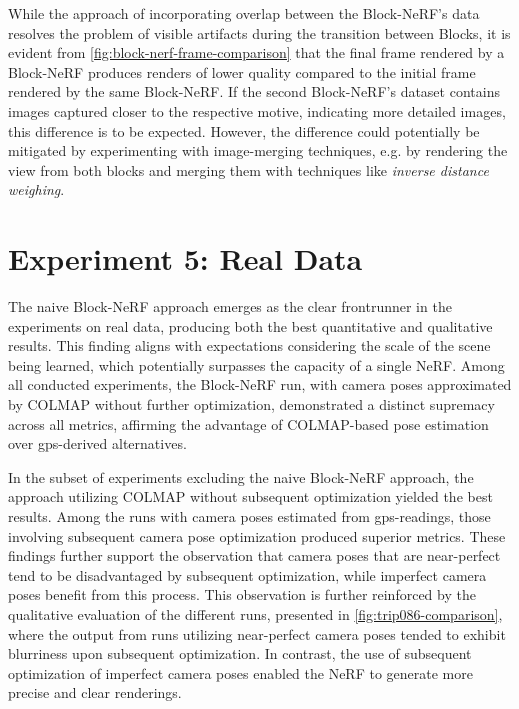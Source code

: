 While the approach of incorporating overlap between the Block-NeRF's data resolves the problem of visible artifacts during the transition between Blocks, it is evident from \autoref{fig:block-nerf-frame-comparison} that the final frame rendered by a Block-NeRF produces renders of lower quality compared to the initial frame rendered by the same Block-NeRF. If the second Block-NeRF's dataset contains images captured closer to the respective motive, indicating more detailed images, this difference is to be expected. However, the difference could potentially be mitigated by experimenting with image-merging techniques, e.g. by rendering the view from both blocks and merging them with techniques like \textit{inverse distance weighing}.




\section{Experiment 5: Real Data}
The naive Block-NeRF approach emerges as the clear frontrunner in the experiments on real data, producing both the best quantitative and qualitative results. This finding aligns with expectations considering the scale of the scene being learned, which potentially surpasses the capacity of a single NeRF. Among all conducted experiments, the Block-NeRF run, with camera poses approximated by COLMAP without further optimization, demonstrated a distinct supremacy across all metrics, affirming the advantage of COLMAP-based pose estimation over \acrshort{gps}-derived alternatives.

In the subset of experiments excluding the naive Block-NeRF approach, the approach utilizing COLMAP without subsequent optimization yielded the best results. Among the runs with camera poses estimated from \acrshort{gps}-readings, those involving subsequent camera pose optimization produced superior metrics. These findings further support the observation that camera poses that are near-perfect tend to be disadvantaged by subsequent optimization, while imperfect camera poses benefit from this process. This observation is further reinforced by the qualitative evaluation of the different runs, presented in \autoref{fig:trip086-comparison}, where the output from runs utilizing near-perfect camera poses tended to exhibit blurriness upon subsequent optimization. In contrast, the use of subsequent optimization of imperfect camera poses enabled the NeRF to generate more precise and clear renderings.



